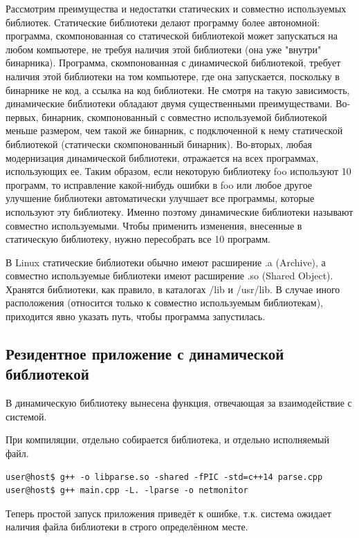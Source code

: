 Рассмотрим преимущества и недостатки статических и совместно используемых библиотек. Статические библиотеки делают программу более автономной: программа, скомпонованная со статической библиотекой может запускаться на любом компьютере, не требуя наличия этой библиотеки (она уже "внутри" бинарника). Программа, скомпонованная с динамической библиотекой, требует наличия этой библиотеки на том компьютере, где она запускается, поскольку в бинарнике не код, а ссылка на код библиотеки. Не смотря на такую зависимость, динамические библиотеки обладают двумя существенными преимуществами. Во-первых, бинарник, скомпонованный с совместно используемой библиотекой меньше размером, чем такой же бинарник, с подключенной к нему статической библиотекой (статически скомпонованный бинарник). Во-вторых, любая модернизация динамической библиотеки, отражается на всех программах, использующих ее. Таким образом, если некоторую библиотеку foo используют 10 программ, то исправление какой-нибудь ошибки в foo или любое другое улучшение библиотеки автоматически улучшает все программы, которые используют эту библиотеку. Именно поэтому динамические библиотеки называют совместно используемыми. Чтобы применить изменения, внесенные в статическую библиотеку, нужно пересобрать все 10 программ.

В Linux статические библиотеки обычно имеют расширение .a (Archive), а совместно используемые библиотеки имеют расширение .so (Shared Object). Хранятся библиотеки, как правило, в каталогах /lib и /usr/lib. В случае иного расположения (относится только к совместно используемым библиотекам), приходится явно указать путь, чтобы программа запустилась\cite{Cit2}. 

\subsection{Резидентное приложение с динамической библиотекой}

В динамическую библиотеку вынесена функция, отвечающая за взаимодействие с системой.

При компиляции, отдельно собирается библиотека, и отдельно исполняемый файл.

\begin{Verbatim}[frame=single]
user@host$ g++ -o libparse.so -shared -fPIC -std=c++14 parse.cpp
user@host$ g++ main.cpp -L. -lparse -o netmonitor
\end{Verbatim}

Теперь простой запуск приложения приведёт к ошибке, т.к. система ожидает наличия файла библиотеки в строго определённом месте.

